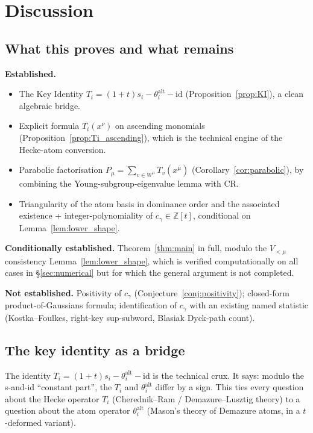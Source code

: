 \documentclass[11pt]{article}
\theoremstyle{definition}
\begin{document}
\section{Discussion}\label{sec:discussion}

\subsection{What this proves and what remains}

\textbf{Established.}
\begin{itemize}
\item The Key Identity $T_i = (1+t)s_i - \theta_i^{\mathrm{alt}} - \mathrm{id}$
  (Proposition~\ref{prop:KI}), a clean algebraic bridge.
\item Explicit formula $T_i(x^\nu)$ on ascending monomials
  (Proposition~\ref{prop:Ti_ascending}), which is the technical engine of
  the Hecke-atom conversion.
\item Parabolic factorisation $P_\mu = \sum_{v \in W^\mu} T_v(x^{\bar\mu})$
  (Corollary~\ref{cor:parabolic}), by combining the Young-subgroup-eigenvalue
  lemma with CR.
\item Triangularity of the atom basis in dominance order and the
  associated existence + integer-polynomiality of $c_\gamma \in \mathbb{Z}[t]$,
  conditional on Lemma~\ref{lem:lower_shape}.
\end{itemize}

\textbf{Conditionally established.} Theorem~\ref{thm:main} in full,
modulo the $V_{<\mu}$ consistency Lemma~\ref{lem:lower_shape}, which is
verified computationally on all cases in \S\ref{sec:numerical} but for
which the general argument is not completed.

\textbf{Not established.} Positivity of $c_\gamma$
(Conjecture~\ref{conj:positivity}); closed-form product-of-Gaussians
formula; identification of $c_\gamma$ with an existing named statistic
(Kostka--Foulkes, right-key sup-subword, Blasiak Dyck-path count).

\subsection{The key identity as a bridge}

The identity $T_i = (1+t)s_i - \theta_i^{\mathrm{alt}} - \mathrm{id}$ is the
technical crux. It says: modulo the s-and-id ``constant part'', the
$T_i$ and $\theta_i^{\mathrm{alt}}$ differ by a sign. This ties every question
about the Hecke operator $T_i$ (Cherednik--Ram / Demazure--Lusztig
theory) to a question about the atom operator $\theta_i^{\mathrm{alt}}$
(Mason's theory of Demazure atoms, in a $t$-deformed variant).
\end{document}

